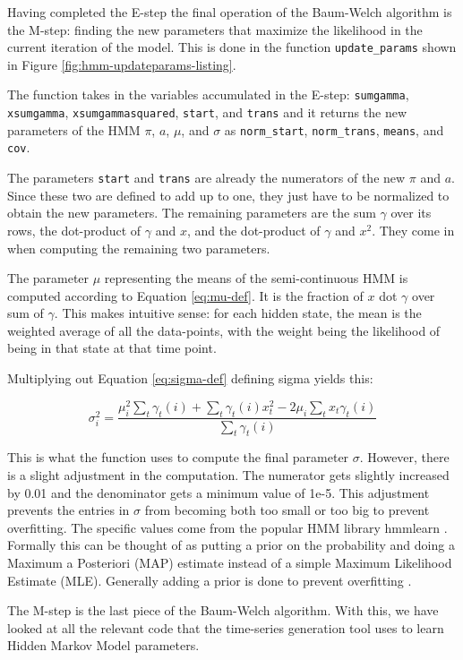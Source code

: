 Having completed the E-step the final operation of the Baum-Welch algorithm is the M-step: finding the new parameters that maximize the likelihood in the current iteration of the model. This is done in the function \texttt{update\_params} shown in Figure \ref{fig:hmm-updateparams-listing}.

The function takes in the variables accumulated in the E-step: \texttt{sumgamma}, \texttt{xsumgamma}, \texttt{xsumgammasquared}, \texttt{start}, and \texttt{trans} and it returns the new parameters of the HMM $\pi$, $a$, $\mu$, and $\sigma$ as \texttt{norm\_start}, \texttt{norm\_trans}, \texttt{means}, and \texttt{cov}. 

The parameters \texttt{start} and \texttt{trans} are already the numerators of the new $\pi$ and $a$. Since these two are defined to add up to one, they just have to be normalized to obtain the new parameters. The remaining parameters are the sum $\gamma$ over its rows, the dot-product of $\gamma$ and $x$, and the dot-product of $\gamma$ and $x^2$. They come in when computing the remaining two parameters. 

The parameter $\mu$ representing the means of the semi-continuous HMM is computed according to Equation \eqref{eq:mu-def}. It is the fraction of $x$ dot $\gamma$ over sum of $\gamma$. This makes intuitive sense: for each hidden state, the mean is the weighted average of all the data-points, with the weight being the likelihood of being in that state at that time point. 

Multiplying out Equation \eqref{eq:sigma-def} defining sigma yields this: 

\begin{equation}
   \sigma_i^2 = \frac{\mu_i^2 \sum_t \gamma_t(i) + \sum_t \gamma_t(i)x_t^2 - 2 \mu_i \sum_t x_t \gamma_t(i)}{\sum_t \gamma_t(i)}
\end{equation}

This is what the function uses to compute the final parameter $\sigma$. However, there is a slight adjustment in the computation. The numerator gets slightly increased by 0.01 and the denominator gets a minimum value of 1e-5. This adjustment prevents the entries in $\sigma$ from becoming both too small or too big to prevent overfitting. The specific values come from the popular HMM library hmmlearn \parencite{weiss2019hmmlearn}. Formally this can be thought of as putting a prior on the probability and doing a Maximum a Posteriori (MAP) estimate instead of a simple Maximum Likelihood Estimate (MLE). Generally adding a prior is done to prevent overfitting \parencite{gauvain1994maximum}.

The M-step is the last piece of the Baum-Welch algorithm. With this, we have looked at all the relevant code that the time-series generation tool uses to learn Hidden Markov Model parameters. 